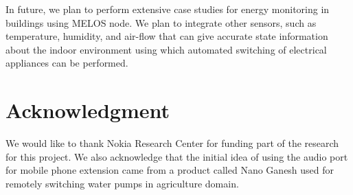 \documentclass[10pt]{sigplan-proc-varsize}
\newcommand{\melos}{MELOS }
\begin{document}
In future, we plan to perform extensive case studies for energy monitoring in buildings using \melos node. We plan to integrate other sensors, such as temperature, humidity, and air-flow that can give accurate state information about the indoor environment using which automated switching of electrical appliances can be performed.

\section{Acknowledgment}
We would like to thank Nokia Research Center for funding part of the research for this project. We also acknowledge that the initial idea of using the audio port for mobile phone extension came from a product called Nano Ganesh used for remotely switching water pumps in agriculture domain.



\end{document}
